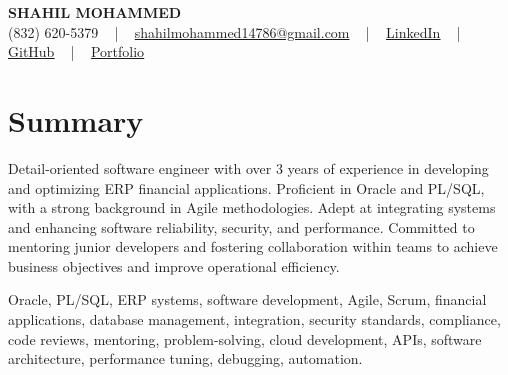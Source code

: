 \documentclass[letterpaper,10pt]{article}
\begin{document}
\begin{center}
    {\fontsize{14pt}{12pt}\selectfont \textbf{\MakeUppercase{Shahil Mohammed}}}\\ \vspace{2pt}
    \fontsize{10pt}{12pt}\selectfont (832) 620-5379 ~ | ~ \href{mailto:shahilmohammed14786@gmail.com}{shahilmohammed14786@gmail.com} ~ | ~  
    \href{https://www.linkedin.com/in/shahil-mohammed-9652931a1/}{\color{blue}\underline{LinkedIn}}  ~ | ~ 
    \href{https://github.com/freakbeast14}{\color{blue}\underline{GitHub}} ~ | ~ 
    \href{https://shahil-mohammed.netlify.app/}{\color{blue}\underline{Portfolio}}
    \vspace{-8pt}
\end{center}

\section{Summary}
\vspace{-2pt}\fontsize{8pt}{9pt}\selectfont
Detail-oriented software engineer with over 3 years of experience in developing and optimizing ERP financial applications. Proficient in Oracle and PL/SQL, with a strong background in Agile methodologies. Adept at integrating systems and enhancing software reliability, security, and performance. Committed to mentoring junior developers and fostering collaboration within teams to achieve business objectives and improve operational efficiency.
 \vspace{-5pt}
 
{\fontsize{1pt}{1pt}\selectfont\color{white}
Oracle, PL/SQL, ERP systems, software development, Agile, Scrum, financial applications, database management, integration, security standards, compliance, code reviews, mentoring, problem-solving, cloud development, APIs, software architecture, performance tuning, debugging, automation.
}
\vspace{-8pt}

\vspace{-2pt}
\end{document}
